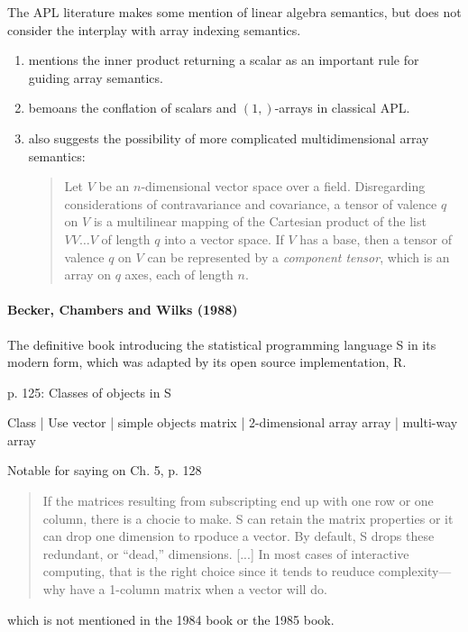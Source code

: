 The APL literature makes some mention of linear algebra semantics, but does not
consider the interplay with array indexing semantics.

\begin{enumerate}
\item \cite{More1973} mentions the inner product returning a scalar as an
	important rule for guiding array semantics.

\item \cite{Haegi1976} bemoans the conflation of scalars and $(1,)$-arrays in
	classical APL.

\item \cite[p. 153]{More1973} also suggests the possibility of more complicated
	multidimensional array semantics:

\begin{quote}
Let $V$ be an $n$-dimensional vector space over a field. Disregarding
considerations of contravariance and covariance, a tensor of valence $q$ on $V$
is a multilinear mapping of the Cartesian product of the list $V V \dots V$ of
length $q$ into a vector space. If $V$ has a base, then a tensor of valence $q$
on $V$ can be represented by a \textit{component tensor}, which is an array on
$q$ axes, each of length $n$.
\end{quote}

\end{enumerate}


\paragraph{Becker, Chambers and Wilks (1988)~\cite{Becker1988}}

The definitive book introducing the statistical programming language S in its
modern form, which was adapted by its open source implementation, R.

p. 125: Classes of objects in S

Class | Use
vector | simple objects
matrix | 2-dimensional array
array | multi-way array

Notable for saying on Ch. 5, p. 128

\begin{quote}
If the matrices resulting from subscripting end up with one row or one
column, there is a chocie to make. S can retain the matrix properties or it can
drop one dimension to rpoduce a vector. By default, S drops these redundant,
or ``dead,'' dimensions. [...]
In most cases of interactive computing, that is the right choice since it tends to
reuduce complexity---why have a 1-column matrix when a vector will do.
\end{quote}

which is not mentioned in the 1984 book or the 1985 book.
